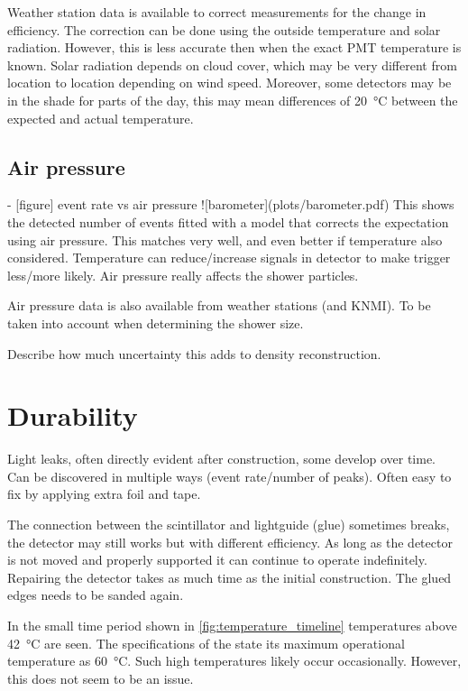 Weather station data is available to correct measurements for the change in efficiency. The correction can be done using the outside temperature and solar radiation. However, this is less accurate then when the exact PMT temperature is known. Solar radiation depends on cloud cover, which may be very different from location to location depending on wind speed. Moreover, some detectors may be in the shade for parts of the day, this may mean differences of \SI{20}{\degreeCelsius} between the expected and actual temperature.


\subsection{Air pressure}


- [figure] event rate vs air pressure
![barometer](plots/barometer.pdf)
This shows the detected number of events fitted with a model that
corrects the expectation using air pressure. This matches very well,
and even better if temperature also considered. Temperature can
reduce/increase signals in detector to make trigger less/more likely.
Air pressure really affects the shower particles.

Air pressure data is also available from weather stations (and KNMI). To be taken into account when determining the shower size.

Describe how much uncertainty this adds to density reconstruction.


\section{Durability}
\label{sec:detector-durability}

Light leaks, often directly evident after construction, some develop over time. Can be discovered in multiple ways (event rate/number of peaks). Often easy to fix by applying extra foil and tape.

The connection between the scintillator and lightguide (glue) sometimes breaks, the detector may still works but with different efficiency. As long as the detector is not moved and properly supported it can continue to operate indefinitely. Repairing the detector takes as much time as the initial construction. The glued edges needs to be sanded again.

In the small time period shown in \cref{fig:temperature_timeline} temperatures above \SI{42}{\degreeCelsius} are seen. The specifications of the \pmt state its maximum operational temperature as \SI{60}{\degreeCelsius}. Such high temperatures likely occur occasionally. However, this does not seem to be an issue.

